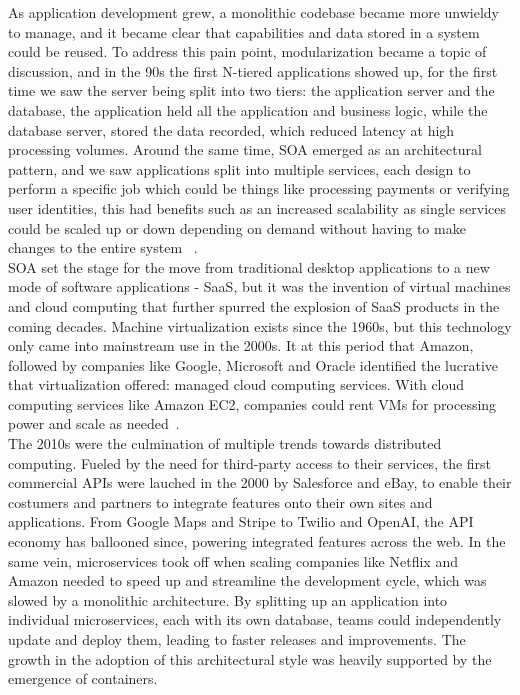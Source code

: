 As application development grew, a monolithic codebase became more unwieldy to manage, and it became clear that
capabilities and data stored in a system could be reused.
To address this pain point, modularization became a topic of discussion, and in the 90s the first N-tiered
applications showed up, for the first time we saw the server being split into two tiers: the application server and
the database, the application held all the application and business logic, while the database server, stored the
data recorded, which reduced latency at high processing volumes.
Around the same time, \ac{SOA} emerged as an architectural pattern, and we saw applications split into multiple
services, each design to perform a specific job which could be things like processing payments or verifying user
identities, this had benefits such as an increased scalability as single services could be scaled up or down
depending on demand without having to make changes to the entire system
~\cite{orkes_software_architecture_evolution, oracle_soa, port_soa}.\\

\ac{SOA} set the stage for the move from traditional desktop applications to a new mode of software applications - \ac{SaaS},
but it was the invention of virtual machines and cloud computing that further spurred the explosion of \ac{SaaS}
products in the coming decades.
Machine virtualization exists since the 1960s, but this technology only came into
mainstream use in the 2000s.
It at this period that Amazon, followed by companies like Google, Microsoft and Oracle identified the lucrative that
virtualization offered: managed cloud computing services.
With cloud computing services like Amazon \ac{EC2}, companies could rent \ac{VM}s for processing power and scale as
needed~\cite{orkes_software_architecture_evolution}.\\

The 2010s were the culmination of multiple trends towards distributed computing.
Fueled by the need for third-party access to their services, the first commercial \ac{API}s were lauched in the
2000 by Salesforce and eBay, to enable their costumers and partners to integrate features onto their own sites and
applications.
From Google Maps and Stripe to Twilio and OpenAI, the \ac{API} economy has ballooned since, powering integrated
features across the web.
In the same vein, microservices took off when scaling companies like Netflix and Amazon needed to speed up and
streamline the development cycle, which was slowed by a monolithic architecture.
By splitting up an application into individual microservices, each with its own database, teams could independently update and deploy them, leading to
faster releases and improvements.\cite{orkes_software_architecture_evolution}
The growth in the adoption of this architectural style was heavily supported by the emergence of containers.\\

